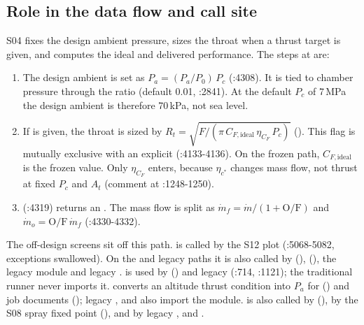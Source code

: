 \subsection{Role in the data flow and call site}

S04 fixes the design ambient pressure, sizes the throat when a thrust target is given, and computes the ideal and delivered performance. The steps at  are:

\begin{enumerate}
\item The design ambient is set as $P_a = (P_a/P_0)\,P_c$ (:4308). It is tied to chamber pressure through the ratio  (default 0.01, :2841). At the default $P_c$ of 7\,MPa the design ambient is therefore 70\,kPa, not sea level.
\item If  is given, the throat is sized by $R_t=\sqrt{F/(\pi\,C_{F,\text{ideal}}\,\eta_{C_F}\,P_c)}$ (). This flag is mutually exclusive with an explicit  (:4133-4136). On the frozen path, $C_{F,\text{ideal}}$ is the frozen value. Only $\eta_{C_F}$ enters, because $\eta_{c^*}$ changes mass flow, not thrust at fixed $P_c$ and $A_t$ (comment at :1248-1250).
\item {} (:4319) returns an . The mass flow is split as $\dot m_f=\dot m/(1+\text{O/F})$ and $\dot m_o=\text{O/F}\,\dot m_f$ (:4330-4332).
\end{enumerate}

The off-design screens sit off this path.  is called by the S12 plot  (:5068-5082, exceptions swallowed). On the  and legacy paths it is also called by  (),  (), the legacy  module and legacy .  is used by  () and legacy  (:714, :1121); the traditional runner never imports it.  converts an altitude thrust condition into $P_a$ for  () and job documents (); legacy ,  and  also import the module.  is also called by  (), by the S08 spray fixed point (), and by legacy ,  and .

